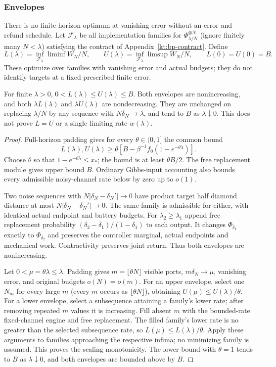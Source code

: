 \subsubsection{Envelopes}
There is no finite-horizon optimum at vanishing error without an
error and refund schedule. Let $\mathcal F_\lambda$ be all
implementation families for $\Phi_{\lambda/N}^{\otimes N}$
(ignore finitely many $N<\lambda$) satisfying the contract of Appendix~\ref{kt:bp-contract}.
Define
\[
 L(\lambda)=\inf_{\mathcal F_\lambda}\liminf W_N/N,\qquad
 U(\lambda)=\inf_{\mathcal F_\lambda}\limsup W_N/N,
 \qquad L(0)=U(0)=B.
\]
These optimize over families with vanishing error and actual budgets;
they do not identify targets at a fixed prescribed finite error.

\begin{theorem}\label{kt:bp-envelopes}
For finite $\lambda>0$, $0<L(\lambda)\le U(\lambda)\le B$.
Both envelopes are nonincreasing, and both
$\lambda L(\lambda)$ and $\lambda U(\lambda)$ are nondecreasing.
They are unchanged on replacing $\lambda/N$ by any sequence with
$N\delta_N\to\lambda$, and tend to $B$ as $\lambda\downarrow0$.
This does not prove $L=U$ or a single limiting rate $w(\lambda)$.
\end{theorem}
\begin{proof}
Full-horizon padding gives for every $\theta\in(0,1]$ the common bound
\[
 L(\lambda),U(\lambda)\ge
 \theta[B-\beta^{-1}f_0(1-e^{-\theta\lambda})].
\]
Choose $\theta$ so that $1-e^{-\theta\lambda}\le x_*$; the bound
is at least $\theta B/2$. The free replacement module gives upper
bound $B$. Ordinary Gibbs-input accounting also bounds every
admissible noisy-channel rate below by zero up to $o(1)$.

Two noise sequences with $N|\delta_N-\delta_N'|\to0$ have product
target half diamond distance at most $N|\delta_N-\delta_N'|\to0$.
The same family is admissible for either, with identical actual
endpoint and battery budgets. For $\lambda_2\ge\lambda_1$ append
free replacement probability $(\delta_2-\delta_1)/(1-\delta_1)$
to each output. It changes $\Phi_{\delta_1}$ exactly to
$\Phi_{\delta_2}$ and preserves the controller marginal, actual
endpoints and mechanical work. Contractivity preserves joint return.
Thus both envelopes are nonincreasing.

Let $0<\mu=\theta\lambda\le\lambda$.
Padding gives $m=\lfloor\theta N\rfloor$ visible ports,
$m\delta_N\to\mu$, vanishing error, and original budgets $o(N)=o(m)$.
For an upper envelope, select one $N_m$ for every large $m$
(every $m$ occurs as $\lfloor\theta N\rfloor$), obtaining
$U(\mu)\le U(\lambda)/\theta$.
For a lower envelope, select a subsequence attaining a family's
lower rate; after removing repeated $m$ values it is increasing.
Fill absent $m$ with the bounded-rate fixed-channel engine and
free replacement. The filled family's lower rate is no greater
than the selected subsequence rate, so
$L(\mu)\le L(\lambda)/\theta$. Apply these arguments to families
approaching the respective infima; no minimizing family is assumed.
This proves the scaling monotonicity.
The lower bound with $\theta=1$ tends to $B$ as $\lambda\downarrow0$,
and both envelopes are bounded above by $B$.
\end{proof}

